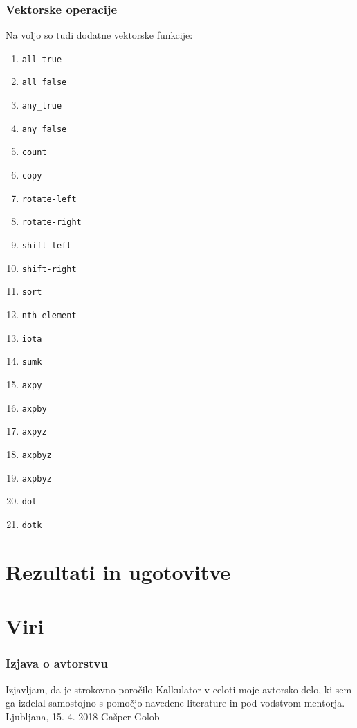 \documentclass[12pt,titlepage]{report}
\begin{document}
		\subsection{Vektorske operacije}
			Na voljo so tudi dodatne vektorske funkcije:
			\begin{multicols}{3}
			\begin{enumerate}
				\item \texttt{all\_true}
				\item \texttt{all\_false}
				\item \texttt{any\_true}
				\item \texttt{any\_false}
				\item \texttt{count}
				\item \texttt{copy}
				\item \texttt{rotate-left}
				\item \texttt{rotate-right}
				\item \texttt{shift-left}
				\item \texttt{shift-right}
				\item \texttt{sort}
				\item \texttt{nth\_element}
				\item \texttt{iota}
				\item \texttt{sumk}
				\item \texttt{axpy}
				\item \texttt{axpby}
				\item \texttt{axpyz}
				\item \texttt{axpbyz}
				\item \texttt{axpbyz}
				\item \texttt{dot}
				\item \texttt{dotk}
			\end{enumerate}
			\end{multicols}
			
\chapter{Rezultati in ugotovitve}



\newpage
\chapter{Viri}
\printbibliography[heading=none]
\newpage
\pagestyle{empty}
\subsection*{Izjava o avtorstvu}
Izjavljam, da je strokovno poročilo Kalkulator v celoti moje avtorsko delo, ki sem ga izdelal samostojno s pomočjo navedene literature in pod vodstvom mentorja.\\[5cm]
Ljubljana, 15. 4. 2018 \hfill Gašper Golob
\end{document}

